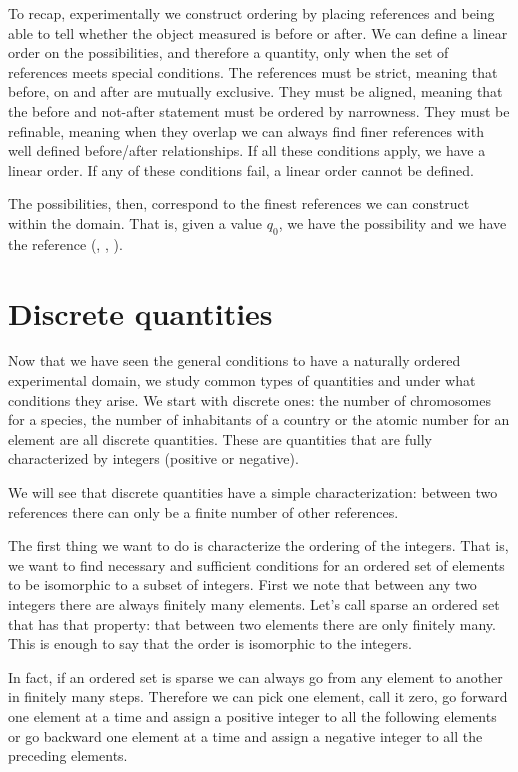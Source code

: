 \documentclass[11pt,letterpaper,fleqn]{memoir} %
\begin{document}
To recap, experimentally we construct ordering by placing references and being able to tell whether the object measured is before or after. We can define a linear order on the possibilities, and therefore a quantity, only when the set of references meets special conditions. The references must be strict, meaning that before, on and after are mutually exclusive. They must be aligned, meaning that the before and not-after statement must be ordered by narrowness. They must be refinable, meaning when they overlap we can always find finer references with well defined before/after relationships. If all these conditions apply, we have a linear order. If any of these conditions fail, a linear order cannot be defined.

The possibilities, then, correspond to the finest references we can construct within the domain. That is, given a value $q_0$, we have the possibility  and we have the reference (, , ).

\section{Discrete quantities}

Now that we have seen the general conditions to have a naturally ordered experimental domain, we study common types of quantities and under what conditions they arise. We start with discrete ones: the number of chromosomes for a species, the number of inhabitants of a country or the atomic number for an element are all discrete quantities. These are quantities that are fully characterized by integers (positive or negative).

We will see that discrete quantities have a simple characterization: between two references there can only be a finite number of other references.

The first thing we want to do is characterize the ordering of the integers. That is, we want to find necessary and sufficient conditions for an ordered set of elements to be isomorphic to a subset of integers. First we note that between any two integers there are always finitely many elements. Let's call sparse an ordered set that has that property: that between two elements there are only finitely many. This is enough to say that the order is isomorphic to the integers.

In fact, if an ordered set is sparse we can always go from any element to another in finitely many steps. Therefore we can pick one element, call it zero, go forward one element at a time and assign a positive integer to all the following elements or go backward one element at a time and assign a negative integer to all the preceding elements.
\end{document}
